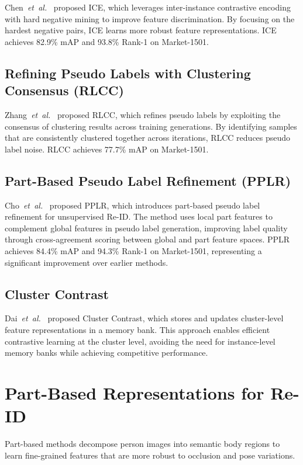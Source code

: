 Chen~\textit{et~al.}~\cite{chen2021ice} proposed ICE, which leverages inter-instance contrastive encoding with hard negative mining to improve feature discrimination. By focusing on the hardest negative pairs, ICE learns more robust feature representations. ICE achieves 82.9\% mAP and 93.8\% Rank-1 on Market-1501.

\subsection{Refining Pseudo Labels with Clustering Consensus (RLCC)}

Zhang~\textit{et~al.}~\cite{zhang2021rlcc} proposed RLCC, which refines pseudo labels by exploiting the consensus of clustering results across training generations. By identifying samples that are consistently clustered together across iterations, RLCC reduces pseudo label noise. RLCC achieves 77.7\% mAP on Market-1501.

\subsection{Part-Based Pseudo Label Refinement (PPLR)}

Cho~\textit{et~al.}~\cite{cho2022pplr} proposed PPLR, which introduces part-based pseudo label refinement for unsupervised Re-ID. The method uses local part features to complement global features in pseudo label generation, improving label quality through cross-agreement scoring between global and part feature spaces. PPLR achieves 84.4\% mAP and 94.3\% Rank-1 on Market-1501, representing a significant improvement over earlier methods.

\subsection{Cluster Contrast}

Dai~\textit{et~al.}~\cite{dai2022cluster} proposed Cluster Contrast, which stores and updates cluster-level feature representations in a memory bank. This approach enables efficient contrastive learning at the cluster level, avoiding the need for instance-level memory banks while achieving competitive performance.

\section{Part-Based Representations for Re-ID}

Part-based methods decompose person images into semantic body regions to learn fine-grained features that are more robust to occlusion and pose variations.


